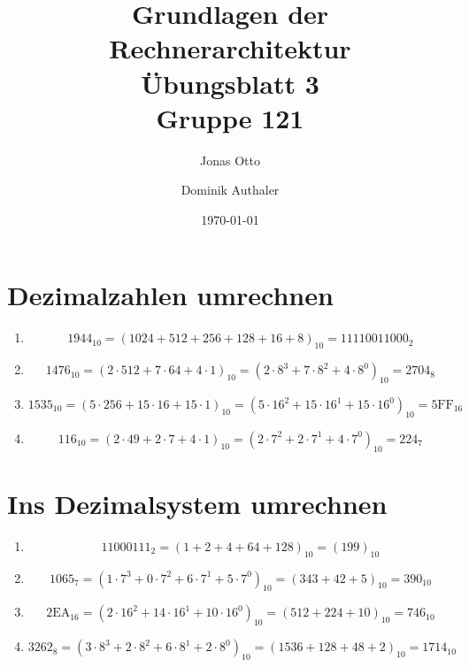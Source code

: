 \documentclass[a4paper]{article}
\title{Grundlagen der Rechnerarchitektur\\ Übungsblatt 3\\Gruppe 121\\}
\author{ Jonas Otto\\ \and Dominik Authaler \\ 
}
\date{\today}
\begin{document}
\maketitle

\section{Dezimalzahlen umrechnen}

\begin{enumerate}[label=\alph*)]
    \item
        \begin{equation*}
            1944_{10} = (1024 + 512 + 256 + 128 + 16 + 8)_{10} = 11110011000_{2}
        \end{equation*}
    \item
        \begin{equation*}
            1476_{10} = (2 \cdot 512 + 7 \cdot 64 + 4 \cdot 1)_{10} = (2 \cdot 8^3 + 7 \cdot 8^2 + 4 \cdot 8^0)_{10} = 2704_{8}
        \end{equation*}
    \item  
        \begin{equation*}
        	1535_{10} = (5 \cdot 256 + 15 \cdot 16 + 15 \cdot 1)_{10} = (5 \cdot 16^2 + 15 \cdot 16^1 + 15 \cdot 16^0)_{10} = \text{5FF}_{16}
        \end{equation*}	
    \item 
        \begin{equation*}
        116_{10} = (2 \cdot 49 + 2 \cdot 7 + 4 \cdot 1)_{10} = (2 \cdot 7^2 + 2 \cdot 7^1 + 4 \cdot 7^0)_{10} = 224_{7} 
        \end{equation*}	
\end{enumerate}

\section{Ins Dezimalsystem umrechnen}
\begin{enumerate}[label=\alph*)]
    \item
        \begin{equation*}
        11000111_{2} = (1 + 2 + 4 + 64 + 128)_{10} = (199)_{10}
        \end{equation*}	
    \item
        \begin{equation*}
        1065_{7} = (1 \cdot 7^3 + 0 \cdot 7^2 + 6 \cdot 7^1 + 5 \cdot 7^0)_{10} = (343 + 42 + 5)_{10} = 390_{10}
        \end{equation*}	
    \item
        \begin{equation*}
        \text{2EA}_{16} = (2 \cdot 16^2 + 14 \cdot 16^1 + 10 \cdot 16^0)_{10} = (512 + 224 + 10)_{10} = 746_{10}
        \end{equation*}	
    \item
        \begin{equation*}
        3262_{8} = (3 \cdot 8^3 + 2 \cdot 8^2 + 6 \cdot 8^1 + 2 \cdot 8^0)_{10} = (1536 + 128 + 48 + 2)_{10} = 1714_{10}
        \end{equation*}	
\end{enumerate}
\end{document}
